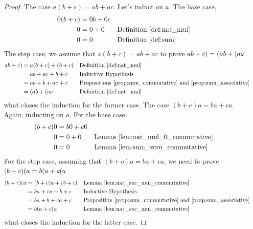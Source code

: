 \begin{proof}
    The case $a(b + c) = ab + ac$. Let's induct on $a$. The base case,
    \begin{align*}
        0(b+c) &= 0b+0c \\
        0&=0 + 0 && \text{Definition~\ref{def:nat_mul}}\\
        0&=0 && \text{Definition~\ref{def:sum}}
    \end{align*}
    The step case, we assume that $a(b+c)=ab+ac$ to prove $a\next(b+c) = (a\next)b + (a\next)c$
    \begin{align*}
        a\next(b+c)&=a(b+c) + (b+c)&&\text{Definition~\ref{def:nat_mul}}\\
        &= ab+ac + b + c&& \text{Inductive Hypothesis}\\
        &= ab + b + ac + c && \text{Propositions~\ref{prop:sum_commutative} and~\ref{prop:sum_associative}}\\
        &= (a\next)b + (a\next)c && \text{Definition~\ref{def:nat_mul}}
    \end{align*}
    what closes the induction for the former case.
    The case $(b + c)a = ba + ca$. Again, inducting on $a$. For the base case:
    \begin{align*}
        (b+c)0 &= b0 +c0 \\
        0 &= 0 + 0 && \text{Lemma~\ref{lem:nat_mul_0_commutative}}\\
        0&=0 && \text{Lemma~\ref{lem:sum_zero_commutative}}
    \end{align*}
    For the step case, assuming that $(b+c)a = ba + ca$, we need to prove $(b+c)(a\next) = b(a\next)+c(a\next)$
    \begin{align*}
        (b+c)(a\next) &= (b+c)a+ (b+c) && \text{Lemma~\ref{lem:nat_suc_mul_commutative}}\\
        &= ba + ca + b + c && \text{Inductive Hypothesis}\\
        & = ba + b + ca + c && \text{Proposition~\ref{prop:sum_commutative} and~\ref{prop:sum_associative}}\\
        & = b(a\next) + c(a\next) && \text{Lemma~\ref{lem:nat_suc_mul_commutative}}
    \end{align*}
    what closes the induction for the latter case.
\end{proof}

